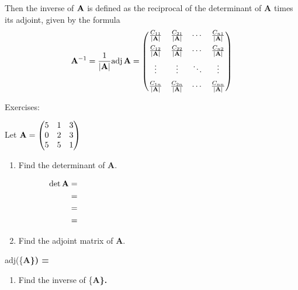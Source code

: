 \documentclass[]{book}
\providecommand{\tightlist}{%
  \setlength{\itemsep}{0pt}\setlength{\parskip}{0pt}}
\theoremstyle{definition}
\theoremstyle{definition}
\theoremstyle{definition}
\theoremstyle{remark}
\begin{document}
Then the inverse of \({\bf A}\) is defined as the reciprocal of the
determinant of \textbf{A} times its adjoint, given by the formula
\[{\bf A}^{-1}=\frac{1}{|{\bf A}|}\mbox{adj\,}{\bf A}= 
        \begin{pmatrix}
            \frac{C_{11}}{|{\bf A}|}&\frac{C_{21}}{|{\bf A}|}&\cdots&\frac{C_{n1}}{|{\bf A}|}\\[6pt]
            \frac{C_{12}}{|{\bf A}|}&\frac{C_{22}}{|{\bf A}|}&\cdots&\frac{C_{n2}}{|{\bf A}|}\\[6pt]
            \vdots     &\vdots     &\ddots&\vdots \\[6pt]
            \frac{C_{1n}}{|{\bf A}|}&\frac{C_{2n}}{|{\bf A}|}&\cdots&\frac{C_{nn}}{|{\bf A}|}
        \end{pmatrix}\]

Exercises:

Let \({\bf A}=\begin{pmatrix} 5&1&3\\0&2&3\\5&5&1 \end{pmatrix}\)

\begin{enumerate}
\def\labelenumi{\arabic{enumi}.}
\tightlist
\item
  Find the determinant of \textbf{A}.

  \begin{eqnarray*}
              \det{\bf A} &=& \phantom{5\cdot(2\cdot 1 - 3\cdot 5) - 1\cdot(0\cdot 1 - 3\cdot 5) + 3\cdot(2\cdot 5 - 0\cdot 5)}\\
              &=& \phantom{5\cdot(-13) - (-15) + 3\cdot(-10)}\\
              &=& \phantom{-65 + 15 - 30}\\
              &=& \phantom{-80}
          \end{eqnarray*}
\item
  Find the adjoint matrix of \textbf{A}.
\end{enumerate}

adj(\{\bf A\}) = \phantom{$\begin{pmatrix}
                -13 & 14 & -3\\
                15 & -10 & -15\\
                -10 & -20 & 10\\
            \end{pmatrix}$}

\begin{enumerate}
\def\labelenumi{\arabic{enumi}.}
\setcounter{enumi}{2}
\tightlist
\item
  Find the inverse of \{\bf A\}.
\end{enumerate}
\end{document}
